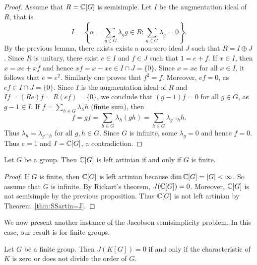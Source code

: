 \begin{proof}
	Assume that $R=\mathbb{C}[G]$ is semisimple.  Let $I$ 
	be the augmentation ideal of $R$, that is
	\[
	I=\left\{\alpha=\sum_{g\in G}\lambda_gg\in R:\sum_{g\in G}\lambda_g=0\right\}.
	\]
	By the previous lemma, 
	there exists exists a non-zero ideal $J$ such that 
	$R=I\oplus J$. Since $R$ is unitary, there exist $e\in I$ and $f\in J$ such that
	$1=e+f$. If
	$x\in I$, then $x=xe+xf$ and hence $xf=x-xe\in I\cap J=\{0\}$. Since 
	$x=xe$ for all $x\in I$, it follows that $e=e^2$. Similarly one proves
	that $f^2=f$. Moreover, $ef=0$, as $ef\in I\cap J=\{0\}$.  Since $I$ 
	is the augmentation ideal of $R$ and $If=(Re)f=R(ef)=\{0\}$, we conclude that
	$(g-1)f=0$
	for all $g\in G$, as $g-1\in I$. If $f=\sum_{h\in
	G}\lambda_hh$ (finite sum), then  
	\[
	f=gf=\sum_{h\in G}\lambda_h(gh)=\sum_{h\in
	G}\lambda_{g^{-1}h}h.
	\]
	Thus $\lambda_h=\lambda_{g^{-1}h}$ for all $g,h\in G$. Since $G$ 
	is infinite, some $\lambda_g=0$ and hence $f=0$. Thus $e=1$ and $I=\mathbb{C}[G]$, a contradiction. 
\end{proof}


\begin{theorem}
	Let $G$ be a group. Then $\mathbb{C}[G]$ 
	is left artinian if and only if 
	$G$ is finite. 
\end{theorem}

\begin{proof}
    If $G$ is finite, then $\mathbb{C}[G]$ is left artinian because $\dim\mathbb{C}[G]=|G|<\infty$. So assume that 
    $G$ is infinite. By Rickart's theorem,   
	$J(\mathbb{C}[G])=0$. Moreover, $\mathbb{C}[G]$
	is not semisimple by the previous proposition. Thus
	$\mathbb{C}[G]$ is not left artinian by Theorem~\ref{thm:SSartin=J}.
\end{proof}


We now present another instance of the Jacobson semisimplicity problem.
In this case, our result is for finite groups. 

\begin{theorem}[Maschke]
	Let $G$ be a finite group. Then $J(K[G])=0$ if and only 
	if the characteristic of $K$ is zero 
	or does not divide the order of $G$. 
\end{theorem}

